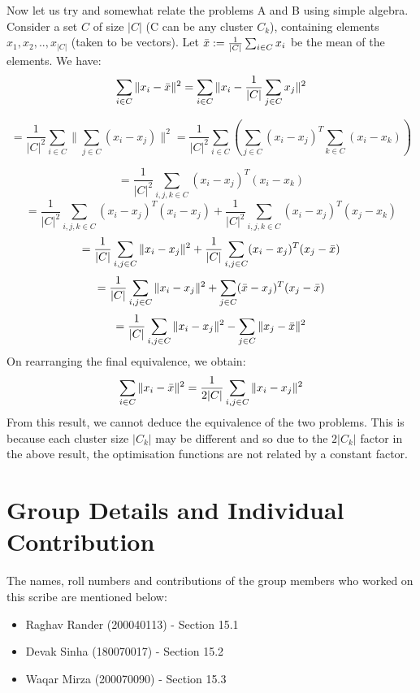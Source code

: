 \documentclass[11pt, twosides]{article}
\begin{document}
Now let us try and somewhat relate the problems A and B using simple algebra. Consider a set $C$ of size $|C|$ (C can be any cluster $C_k$), containing elements $x_1, x_2,..,x_{|C|}$ (taken to be vectors). Let $\Bar{x}:=\frac{1}{|C|}\sum_{i\in C} x_i$ be the mean of the elements. We have:
\begin{equation}
    \sum_{i\in C}  \|x_i-\Bar{x}\|^2 = \sum_{i\in C}  \|x_i-\frac{1}{|C|}\sum_{j\in C} x_j\|^2
\end{equation}

\begin{equation}
    =\frac{1}{|C|^2}\sum_{i\in C}\|\sum_{j\in C}(x_i-x_j)\|^2=\frac{1}{|C|^2}\sum_{i\in C}(\sum_{j\in C}(x_i-x_j)^T \sum_{k\in C}(x_i-x_k))
\end{equation}

\begin{equation}
    =\frac{1}{|C|^2}\sum_{i,j,k\in C}(x_i-x_j)^T(x_i-x_k)
\end{equation}
\begin{equation}
    =\frac{1}{|C|^2}\sum_{i,j,k\in C}(x_i-x_j)^T(x_i-x_j)+\frac{1}{|C|^2}\sum_{i,j,k\in C}(x_i-x_j)^T(x_j-x_k)
\end{equation}
\begin{equation}
    =\frac{1}{|C|}\sum_{i,j\in C}\|x_i-x_j\|^2+\frac{1}{|C|}\sum_{i,j\in C}(x_i-x_j)^T(x_j-\Bar{x})
\end{equation}
\begin{equation}
    =\frac{1}{|C|}\sum_{i,j\in C}\|x_i-x_j\|^2+\sum_{j\in C}(\Bar{x}-x_j)^T(x_j-\Bar{x})
\end{equation}
\begin{equation}
    =\frac{1}{|C|}\sum_{i,j\in C}\|x_i-x_j\|^2-\sum_{j\in C}\|x_j-\Bar{x}\|^2
\end{equation}
On rearranging the final equivalence, we obtain:
\begin{equation}
    \sum_{i\in C}\|x_i-\Bar{x}\|^2=\frac{1}{2|C|}\sum_{i,j\in C}\|x_i-x_j\|^2
\end{equation}
From this result, we cannot deduce the equivalence of the two problems. This is because each cluster size $|C_k|$ may be different and so due to the $2|C_k|$ factor in the above result, the optimisation functions are not related by a constant factor.

\section{Group Details and Individual Contribution}

The names, roll numbers and contributions of the group members who worked on this scribe are mentioned below:

\begin{itemize}
    \item Raghav Rander (200040113) - Section 15.1
    \item Devak Sinha (180070017) - Section 15.2
    \item Waqar Mirza (200070090) - Section 15.3
\end{itemize}
\end{document}
